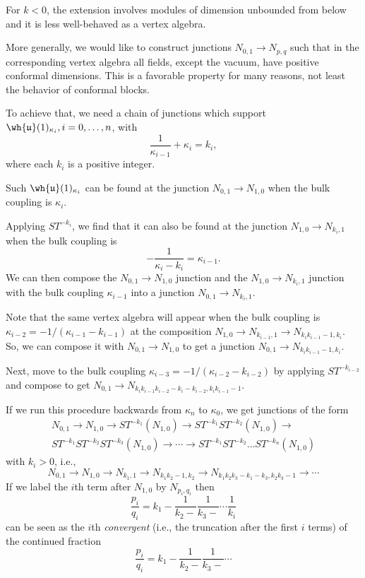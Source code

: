 \documentclass[11pt,reqno]{amsart}
\theoremstyle{plain}
\numberwithin{equation}{section}
\theoremstyle{definition}
\begin{document}
For $k<0$, the extension involves modules of dimension unbounded from
below and it is less well-behaved as a vertex algebra.

More generally, we would like to construct junctions $N_{0,1} \to
N_{p,q}$ such that in the corresponding vertex algebra all fields,
except the vacuum, have positive conformal dimensions. This is a
favorable property for many reasons, not least the behavior of
conformal blocks.

To achieve that, we need a chain of junctions which support
$\wh{\mathfrak{u}}(1)_{\kappa_i}, i=0,\ldots,n$, with
$$
\frac{1}{\kappa_{i-1}} + \kappa_{i} = k_i,
$$
where each $k_i$ is a positive integer.

Such $\wh{\mathfrak{u}}(1)_{\kappa_i}$ can be found at the junction
$N_{0,1} \to N_{1,0}$ when the bulk coupling is $\kappa_i$.

Applying $ST^{-k_i}$, we find that it can also be found at the junction
$N_{1,0} \to N_{k_i,1}$ when the bulk coupling is
$$
-\frac{1}{\kappa_i - k_i} = \kappa_{i-1}.
$$
We can then compose the $N_{0,1} \to N_{1,0}$ junction and the
$N_{1,0} \to N_{k_i,1}$ junction with the bulk coupling $\kappa_{i-1}$
into a junction $N_{0,1} \to N_{k_i,1}$.

Note that the same vertex algebra will appear when the bulk coupling
is $\kappa_{i-2} = -1/(\kappa_{i-1} - k_{i-1})$ at the
  composition $N_{1,0} \to N_{k_{i-1},1} \to N_{k_i
    k_{i-1}-1,k_i}$. So, we can compose it with $N_{0,1} \to N_{1,0}$
  to get a junction $N_{0,1} \to N_{k_i k_{i-1}-1,k_i}$.

Next, move to the bulk coupling $\kappa_{i-3} = -1/(\kappa_{i-2} -
  k_{i-2})$ by applying $S T^{-k_{i-2}}$ and compose to get $N_{0,1}
  \to N_{k_i k_{i-1} k_{i-2} - k_i -k_{i-2}, k_{i} k_{i-1}-1}$.

  If we run this procedure backwards from $\kappa_n$ to $\kappa_0$, we
  get junctions of the form
\begin{multline*}
N_{0,1}\to N_{1,0} \to ST^{-k_1}(N_{1,0}) \to
ST^{-k_1}ST^{-k_2}(N_{1,0}) \to \\ ST^{-k_1}ST^{-k_2}ST^{-k_3}(N_{1,0})
\to \cdots \to ST^{-k_1}ST^{-k_2} \ldots ST^{-k_n}(N_{1,0})
\end{multline*}
with $k_i>0$, i.e.,
\begin{equation}
N_{0,1}\to N_{1,0} \to N_{k_1,1} \to N_{k_1 k_2 - 1,k_2} \to N_{k_1
  k_2 k_3 - k_1 - k_3,k_2 k_3 - 1} \to \cdots
\end{equation}
If we label the $i$th term after $N_{1,0}$ by $N_{p_i,q_i}$ then
\begin{equation}
\frac{p_i}{q_i} = k_{1} - \frac{1}{k_{2}-}\frac{1}{k_{3}-}\cdots
\frac{1}{k_{i}}
\end{equation}
can be seen as the $i$th {\it convergent}  (i.e., the
truncation after the first $i$ terms) of the continued fraction
\begin{equation}
\frac{p_i}{q_i} = k_{1} - \frac{1}{k_{2}-}\frac{1}{k_{3}-}\cdots
\end{equation}
\end{document}
